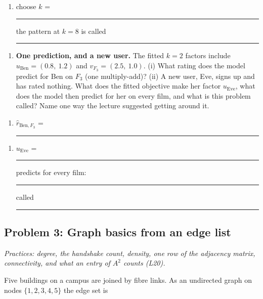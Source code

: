 \documentclass[
  11pt,
]{article}
\providecommand{\tightlist}{%
  \setlength{\itemsep}{0pt}\setlength{\parskip}{0pt}}
\newcommand{\answerspace}[1]{\par\vspace*{#1}}  %
\newcommand{\blank}[1][1.2in]{\rule{#1}{0.4pt}}
\newcommand{\answerpage}{\clearpage}
\begin{document}
\answerspace{1.0in}

\begin{enumerate}
\def\labelenumi{(\roman{enumi})}
\setcounter{enumi}{1}
\tightlist
\item
  choose \(k\) = \blank[0.5in]\qquad the pattern at \(k=8\) is called
  \blank[1.2in]
\end{enumerate}

\answerspace{0.4in}

\begin{enumerate}
\def\labelenumi{(\alph{enumi})}
\setcounter{enumi}{1}
\tightlist
\item
  \textbf{One prediction, and a new user.} The fitted \(k=2\) factors
  include \(u_{\text{Ben}} = (0.8,\ 1.2)\) and
  \(v_{F_3} = (2.5,\ 1.0)\). (i) What rating does the model predict for
  Ben on \(F_3\) (one multiply-add)? (ii) A new user, Eve, signs up and
  has rated nothing. What does the fitted objective make her factor
  \(u_{\text{Eve}}\), what does the model then predict for her on every
  film, and what is this problem called? Name one way the lecture
  suggested getting around it.
\end{enumerate}

\begin{enumerate}
\def\labelenumi{(\roman{enumi})}
\tightlist
\item
  \(\hat r_{\text{Ben},F_3}\) = \blank[0.9in]
\end{enumerate}

\answerspace{0.3in}

\begin{enumerate}
\def\labelenumi{(\roman{enumi})}
\setcounter{enumi}{1}
\tightlist
\item
  \(u_{\text{Eve}}\) = \blank[0.9in]\qquad predicts for every film:
  \blank[1.6in]\qquad called \blank[1.0in]
\end{enumerate}

\answerspace{0.6in}

\answerpage

\subsection{Problem 3: Graph basics from an edge
list}\label{problem-3-graph-basics-from-an-edge-list}

\emph{Practices: degree, the handshake count, density, one row of the
adjacency matrix, connectivity, and what an entry of \(A^2\) counts
(L20).}

Five buildings on a campus are joined by fibre links. As an undirected
graph on nodes \(\{1,2,3,4,5\}\) the edge set is
\end{document}
